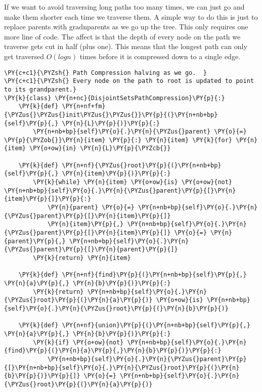 If we want to avoid traversing long paths too many times, we can just go and make them shorter each time we traverse them.  A simple way to do this is just to replace parents with gradnparents as we go up the tree.  This only requires one more line of code.  The affect is that the depth of every node on the path we traverse gets cut in half (plus one).  This means that the longest path can only get traversed $O(log n)$ times before it is compressed down to a single edge.

\begin{Verbatim}[commandchars=\\\{\}]
\PY{c+c1}{\PYZsh{} Path Compression halving as we go.  }
\PY{c+c1}{\PYZsh{} Every node on the path to root is updated to point to its grandparent.}
\PY{k}{class} \PY{n+nc}{DisjointSetsPathCompression}\PY{p}{:}
    \PY{k}{def} \PY{n+nf+fm}{\PYZus{}\PYZus{}init\PYZus{}\PYZus{}}\PY{p}{(}\PY{n+nb+bp}{self}\PY{p}{,} \PY{n}{L}\PY{p}{)}\PY{p}{:}
        \PY{n+nb+bp}{self}\PY{o}{.}\PY{n}{\PYZus{}parent} \PY{o}{=} \PY{p}{\PYZob{}}\PY{n}{item} \PY{p}{:} \PY{n}{item} \PY{k}{for} \PY{n}{item} \PY{o+ow}{in} \PY{n}{L}\PY{p}{\PYZcb{}}

    \PY{k}{def} \PY{n+nf}{\PYZus{}root}\PY{p}{(}\PY{n+nb+bp}{self}\PY{p}{,} \PY{n}{item}\PY{p}{)}\PY{p}{:}
        \PY{k}{while} \PY{n}{item} \PY{o+ow}{is} \PY{o+ow}{not} \PY{n+nb+bp}{self}\PY{o}{.}\PY{n}{\PYZus{}parent}\PY{p}{[}\PY{n}{item}\PY{p}{]}\PY{p}{:}
            \PY{n}{parent} \PY{o}{=} \PY{n+nb+bp}{self}\PY{o}{.}\PY{n}{\PYZus{}parent}\PY{p}{[}\PY{n}{item}\PY{p}{]}
            \PY{n}{item}\PY{p}{,} \PY{n+nb+bp}{self}\PY{o}{.}\PY{n}{\PYZus{}parent}\PY{p}{[}\PY{n}{item}\PY{p}{]} \PY{o}{=} \PY{n}{parent}\PY{p}{,} \PY{n+nb+bp}{self}\PY{o}{.}\PY{n}{\PYZus{}parent}\PY{p}{[}\PY{n}{parent}\PY{p}{]}
        \PY{k}{return} \PY{n}{item}

    \PY{k}{def} \PY{n+nf}{find}\PY{p}{(}\PY{n+nb+bp}{self}\PY{p}{,} \PY{n}{a}\PY{p}{,} \PY{n}{b}\PY{p}{)}\PY{p}{:}
        \PY{k}{return} \PY{n+nb+bp}{self}\PY{o}{.}\PY{n}{\PYZus{}root}\PY{p}{(}\PY{n}{a}\PY{p}{)} \PY{o+ow}{is} \PY{n+nb+bp}{self}\PY{o}{.}\PY{n}{\PYZus{}root}\PY{p}{(}\PY{n}{b}\PY{p}{)}

    \PY{k}{def} \PY{n+nf}{union}\PY{p}{(}\PY{n+nb+bp}{self}\PY{p}{,} \PY{n}{a}\PY{p}{,} \PY{n}{b}\PY{p}{)}\PY{p}{:}
        \PY{k}{if} \PY{o+ow}{not} \PY{n+nb+bp}{self}\PY{o}{.}\PY{n}{find}\PY{p}{(}\PY{n}{a}\PY{p}{,}\PY{n}{b}\PY{p}{)}\PY{p}{:}
            \PY{n+nb+bp}{self}\PY{o}{.}\PY{n}{\PYZus{}parent}\PY{p}{[}\PY{n+nb+bp}{self}\PY{o}{.}\PY{n}{\PYZus{}root}\PY{p}{(}\PY{n}{b}\PY{p}{)}\PY{p}{]} \PY{o}{=} \PY{n+nb+bp}{self}\PY{o}{.}\PY{n}{\PYZus{}root}\PY{p}{(}\PY{n}{a}\PY{p}{)}
\end{Verbatim}



